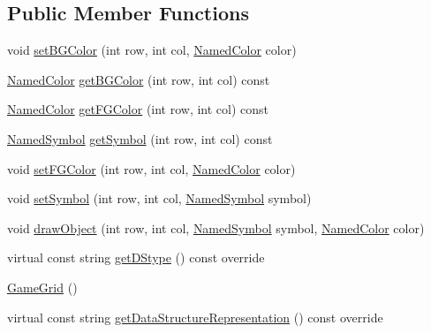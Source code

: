 \subsection*{Public Member Functions}
\begin{DoxyCompactItemize}
\item 
void \mbox{\hyperlink{classbridges_1_1_game_grid_aa877047d613ace46190c161f0c31a1b3}{set\+B\+G\+Color}} (int row, int col, \mbox{\hyperlink{namespacebridges_ad811207d8898a7fd6b72a74725e68357}{Named\+Color}} color)
\item 
\mbox{\hyperlink{namespacebridges_ad811207d8898a7fd6b72a74725e68357}{Named\+Color}} \mbox{\hyperlink{classbridges_1_1_game_grid_a83edc2bc4a249e4247efa78765ff3901}{get\+B\+G\+Color}} (int row, int col) const
\item 
\mbox{\hyperlink{namespacebridges_ad811207d8898a7fd6b72a74725e68357}{Named\+Color}} \mbox{\hyperlink{classbridges_1_1_game_grid_af67d9a674e35ed54fff39cd4b0c6ce3a}{get\+F\+G\+Color}} (int row, int col) const
\item 
\mbox{\hyperlink{namespacebridges_acfb0a4f7877d8f63de3e6862004c50ed}{Named\+Symbol}} \mbox{\hyperlink{classbridges_1_1_game_grid_a9e3450aae2d92f781b298a5cd0aa5b62}{get\+Symbol}} (int row, int col) const
\item 
void \mbox{\hyperlink{classbridges_1_1_game_grid_aff88dfdc61c69af5881665d937f07ee4}{set\+F\+G\+Color}} (int row, int col, \mbox{\hyperlink{namespacebridges_ad811207d8898a7fd6b72a74725e68357}{Named\+Color}} color)
\item 
void \mbox{\hyperlink{classbridges_1_1_game_grid_a733c0e0cd549248292e08a2dca09637e}{set\+Symbol}} (int row, int col, \mbox{\hyperlink{namespacebridges_acfb0a4f7877d8f63de3e6862004c50ed}{Named\+Symbol}} symbol)
\item 
void \mbox{\hyperlink{classbridges_1_1_game_grid_a6cd5a11ca69e4753760741e27b08d008}{draw\+Object}} (int row, int col, \mbox{\hyperlink{namespacebridges_acfb0a4f7877d8f63de3e6862004c50ed}{Named\+Symbol}} symbol, \mbox{\hyperlink{namespacebridges_ad811207d8898a7fd6b72a74725e68357}{Named\+Color}} color)
\item 
virtual const string \mbox{\hyperlink{classbridges_1_1_game_grid_a668f4f82739798f808a9f0b582d49dac}{get\+D\+Stype}} () const override
\item 
\mbox{\hyperlink{classbridges_1_1_game_grid_ac3e87a3086b5a61b57e2ace30547ed06}{Game\+Grid}} ()
\item 
virtual const string \mbox{\hyperlink{classbridges_1_1_game_grid_a5f023a7320cdc35474ab006320d778b4}{get\+Data\+Structure\+Representation}} () const override
\end{DoxyCompactItemize}
